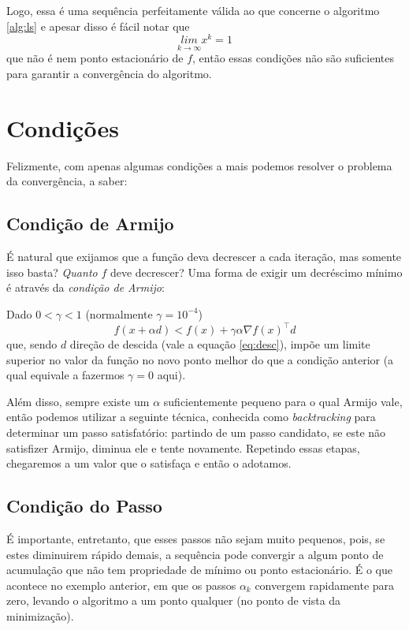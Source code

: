 \documentclass[a4paper,11pt]{article}
\begin{document}
        Logo, essa é uma sequência perfeitamente válida ao que concerne o algoritmo \ref{alg:ls} e apesar disso é fácil notar que
            $$ \underset{k \rightarrow \infty}{lim} x^k = 1$$
        que não é nem ponto estacionário de $f$, então essas condições não são suficientes para garantir a convergência do algoritmo.
    \section*{Condições}
        Felizmente, com apenas algumas condições a mais podemos resolver o problema da convergência, a saber:

        \subsection*{Condição de Armijo}
            É natural que exijamos que a função deva decrescer a cada iteração, mas somente isso basta? \emph{Quanto} $f$
            deve decrescer? Uma forma de exigir um decréscimo mínimo é através da \emph{condição de Armijo}:

            Dado $0 < \gamma < 1$ (normalmente $\gamma = 10^{-4}$)
                $$ f(x + \alpha d) < f(x) + \gamma \alpha \nabla f(x)^\top d $$
            que, sendo $d$ direção de descida (vale a equação \ref{eq:desc}), impõe um limite superior no valor da função
            no novo ponto melhor do que a condição anterior (a qual equivale a fazermos $\gamma = 0$ aqui).

            Além disso, sempre existe um $\alpha$ suficientemente pequeno para o qual Armijo vale, então podemos utilizar
            a seguinte técnica, conhecida como \emph{backtracking} para determinar um passo satisfatório: partindo de um
            passo candidato, se este não satisfizer Armijo, diminua ele e tente novamente. Repetindo essas etapas, chegaremos a
            um valor que o satisfaça e então o adotamos.

        \subsection*{Condição do Passo}
            É importante, entretanto, que esses passos não sejam muito pequenos, pois, se estes diminuirem rápido demais, a sequência pode
            convergir a algum ponto de acumulação que não tem propriedade de mínimo ou ponto estacionário. É o que acontece
            no exemplo anterior, em que os passos $\alpha_k$ convergem rapidamente para zero, levando o algoritmo a um ponto
            qualquer (no ponto de vista da minimização).
\end{document}

